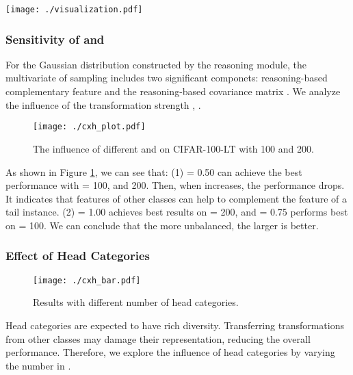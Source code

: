 \documentclass[letterpaper]{article} \usepackage{aaai22}  \usepackage{times}  \usepackage{helvet}  \usepackage{courier}  \usepackage[hyphens]{url}  \usepackage{graphicx} \usepackage{bm}
\begin{document}
	\begin{figure*}[!tp]
\centering
\texttt{[image: ./visualization.pdf]}
		\caption{ Visualization of the semantically augmented images for the four tail classes on ImageNet-LT: Wagon, Dunlin, White Stork, and Miniature Schnauzer. ``Original" represents the original training sample. ``Restored" is the image reconstructed by a generator with features of the corresponding training sample. And ``Augmented Images" are generated with features sampled from our refined feature distribution. Our method can generate samples with semantic transformations that are not found in the original training set in terms of color, angle, pose, background, etc. These samples are highlighted in green boxes.}
		\label{visualization}
	\end{figure*}
	
	\subsubsection{Sensitivity of  and }
	For the Gaussian distribution  constructed by the reasoning module, the multivariate of sampling includes two significant componets: reasoning-based complementary feature  and the reasoning-based covariance matrix . We analyze the influence of the transformation strength , . 
\begin{figure}[!ht]
\centering
		\texttt{[image: ./cxh\_plot.pdf]}
		\caption{The influence of different  and  on CIFAR-100-LT with  100 and  200.}
		\label{cxh_plot}
	\end{figure}

	
	As shown in Figure \ref{cxh_plot}, we can see that: (1)  = 0.50 can achieve the best performance with  = 100, and 200. Then, when  increases, the performance drops. It indicates that features of other classes can help to complement the feature of a tail instance. (2)  = 1.00 achieves best results on  = 200, and  = 0.75 performs best on  = 100. We can conclude that the more unbalanced, the larger  is better.
\subsubsection{Effect of Head Categories}
\begin{figure}
\centering
		\texttt{[image: ./cxh\_bar.pdf]}
		\caption{Results with different number of head categories.}
		\label{cxh_bar}
	\end{figure}
Head categories are expected to have rich diversity. Transferring transformations from other classes may damage their representation, reducing the overall performance. Therefore, we explore the influence of head categories by varying the number in .
	
\end{document}
